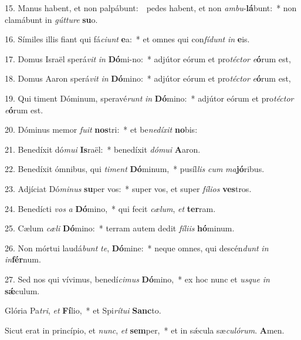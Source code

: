 \begin{latinenglishsection}
{	 15. Manus habent, et non palpábunt:~\GreDagger\
		pedes habent, et non \textit{am}\textit{bu}-\linebreak \textbf{lá}bunt:~*
		non clamábunt in \textit{gút}\textit{tu}\textit{re} \textbf{su}o.
	
	 16. Símiles illis fiant qui fá\textit{ci}\textit{unt} \textbf{e}a:~*
		et omnes qui con\textit{fí}\textit{dunt} \textit{in} \textbf{e}is.
	
	 17. Domus Israël sperá\textit{vit} \textit{in} \textbf{Dó}mi-\linebreak no:~*
		adjútor eórum et pro\textit{téc}\textit{tor} \textit{e}\textbf{ó}rum est,
	
	 18. Domus Aaron sperá\textit{vit} \textit{in} \textbf{Dó}mino:~*
		adjútor eórum et pro\textit{téc}\textit{tor} \textit{e}\textbf{ó}rum est,
	
	 19. Qui timent Dóminum, speravé\textit{runt} \textit{in} \textbf{Dó}mino:~*
		adjútor eórum et pro\textit{téc}\textit{tor} \textit{e}\textbf{ó}rum est.
	
	 20. Dóminus memor \textit{fu}\textit{it} \textbf{nos}tri:~*
		et be\textit{ne}\textit{dí}\textit{xit} \textbf{no}bis:
	
	 21. Benedíxit dó\textit{mu}\textit{i} \textbf{Is}raël:~*
		benedíxit \textit{dó}\textit{mu}\textit{i} \textbf{A}aron.
	
	 22. Benedíxit ómnibus, qui \textit{ti}\textit{ment} \textbf{Dó}minum,~*
		pusíl\textit{lis} \textit{cum} \textit{ma}\textbf{jó}ribus.
	
	 23. Adjíciat Dó\textit{mi}\textit{nus} \textbf{su}per vos:~*
		super vos, et super \textit{fí}\textit{li}\textit{os} \textbf{ves}tros.
	
	 24. Benedícti \textit{vos} \textit{a} \textbf{Dó}mino,~*
		qui fecit \textit{cæ}\textit{lum}, \textit{et} \textbf{ter}ram.
	
	 25. Cælum \textit{cæ}\textit{li} \textbf{Dó}mino:~*
		terram autem dedit \textit{fí}\textit{li}\textit{is} \textbf{hó}minum.
	
	 26. Non mórtui laudá\textit{bunt} \textit{te}, \textbf{Dó}mine:~*
		neque omnes, qui descén\textit{dunt} \textit{in} \textit{in}\textbf{fér}num.
	
	 27. Sed nos qui vívimus, benedí\textit{ci}\textit{mus} \textbf{Dó}mino,~*
		ex hoc nunc et \textit{us}\textit{que} \textit{in} \textbf{s\'{\ae}}culum.
	
	 Glória Pa\textit{tri}, \textit{et} \textbf{Fí}lio,~*
		et Spi\textit{rí}\textit{tu}\textit{i} \textbf{Sanc}to.
	
	 Sicut erat in princípio, et \textit{nunc}, \textit{et} \textbf{sem}per,~*
		et in s\'{\ae}cula sæ\textit{cu}\textit{ló}\textit{rum}. \textbf{A}men.
}{
	
}

\end{latinenglishsection}